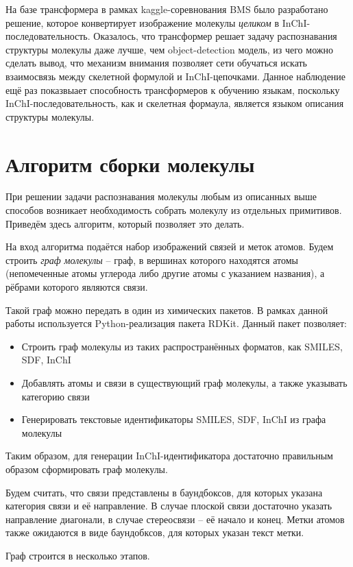 На базе трансформера в рамках kaggle-соревнования BMS \cite{bms} было разработано решение, которое конвертирует изображение молекулы \textit{целиком} в InChI-последовательность. Оказалось, что трансформер решает задачу распознавания структуры молекулы даже лучше, чем object-detection модель, из чего можно сделать вывод, что механизм внимания позволяет сети обучаться искать взаимосвязь между скелетной формулой и InChI-цепочками. Данное наблюдение ещё раз показвыает способность трансформеров к обучению языкам, поскольку InChI-последовательность, как и скелетная формаула, является языком описания структуры молекулы.


\section{Алгоритм сборки молекулы} \label{ch1:sec4}
При решении задачи распознавания молекулы любым из описанных выше способов возникает необходимость собрать молекулу из отдельных примитивов. Приведём здесь алгоритм, который позволяет это делать.

На вход алгоритма подаётся набор изображений связей и меток атомов. Будем строить \textit{граф молекулы} -- граф, в вершинах которого находятся атомы (непомеченные атомы углерода либо другие атомы с указанием названия), а рёбрами которого являются связи.

Такой граф можно передать в один из химических пакетов. В рамках данной работы используется Python-реализация пакета RDKit. Данный пакет позволяет:
\begin{itemize}
	\item Строить граф молекулы из таких распространённых форматов, как SMILES, SDF, InChI
	\item Добавлять атомы и связи в существующий граф молекулы, а также указывать категорию связи
	\item Генерировать текстовые идентификаторы SMILES, SDF, InChI из графа молекулы
\end{itemize}

Таким образом, для генерации InChI-идентификатора достаточно правильным образом сформировать граф молекулы.

Будем считать, что связи представлены в баундбоксов, для которых указана категория связи и её направление. В случае плоской связи достаточно указать направление диагонали, в случае стереосвязи -- её начало и конец. Метки атомов также ожидаются в виде баундобксов, для которых указан текст метки.

Граф строится в несколько этапов.

